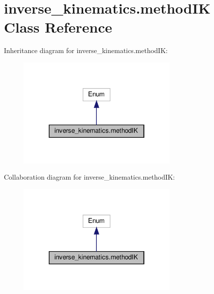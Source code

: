 \hypertarget{classinverse__kinematics_1_1method_i_k}{}\section{inverse\+\_\+kinematics.\+method\+IK Class Reference}
\label{classinverse__kinematics_1_1method_i_k}


Inheritance diagram for inverse\+\_\+kinematics.\+method\+IK\+:
\nopagebreak
\begin{figure}[H]
\begin{center}
\leavevmode
\includegraphics[width=226pt]{classinverse__kinematics_1_1method_i_k__inherit__graph}
\end{center}
\end{figure}


Collaboration diagram for inverse\+\_\+kinematics.\+method\+IK\+:
\nopagebreak
\begin{figure}[H]
\begin{center}
\leavevmode
\includegraphics[width=226pt]{classinverse__kinematics_1_1method_i_k__coll__graph}
\end{center}
\end{figure}
